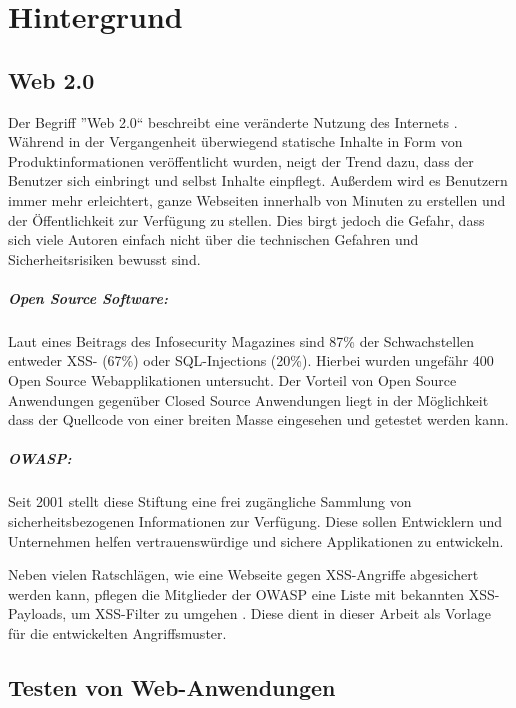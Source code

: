 \chapter{Hintergrund}\label{Hintergrund}

\section{Web 2.0}

Der Begriff ''Web 2.0`` beschreibt eine veränderte Nutzung des Internets \cite{Lackes}. Während in der Vergangenheit überwiegend statische Inhalte in Form von Produktinformationen veröffentlicht wurden, neigt der Trend dazu, dass der Benutzer sich einbringt und selbst Inhalte einpflegt. Außerdem wird es Benutzern immer mehr erleichtert, ganze Webseiten innerhalb von Minuten zu erstellen und der Öffentlichkeit zur Verfügung zu stellen. Dies birgt jedoch die Gefahr, dass sich viele Autoren einfach nicht über die technischen Gefahren und Sicherheitsrisiken bewusst sind.

\paragraph{Open Source Software:}
Laut eines Beitrags des Infosecurity Magazines \cite{Seals2016} sind 87\% der Schwachstellen entweder \acl{XSS}- (67\%) oder SQL-Injections (20\%). Hierbei wurden ungefähr 400 Open Source Webapplikationen untersucht. Der Vorteil von Open Source Anwendungen gegenüber Closed Source Anwendungen liegt in der Möglichkeit dass der Quellcode von einer breiten Masse eingesehen und getestet werden kann.

\paragraph{\ac{OWASP}:}
Seit 2001 stellt diese Stiftung eine frei zugängliche Sammlung von sicherheitsbezogenen Informationen zur Verfügung. Diese sollen Entwicklern und Unternehmen helfen vertrauenswürdige und sichere Applikationen zu entwickeln.

Neben vielen Ratschlägen, wie eine Webseite gegen XSS-Angriffe abgesichert werden kann, pflegen die Mitglieder der OWASP eine Liste mit bekannten XSS- Payloads, um XSS-Filter zu umgehen \cite{OWASP2012}. Diese dient in dieser Arbeit als Vorlage für die entwickelten Angriffsmuster.

\section{Testen von Web-Anwendungen}


